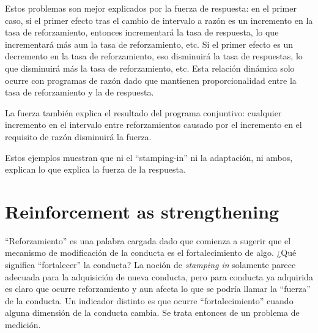 \documentclass[a4paper,12pt]{article}
\begin{document}
Estos problemas son mejor explicados por la fuerza de respuesta: en el primer caso, si el primer efecto tras el cambio de intervalo a razón es un incremento en la tasa de reforzamiento, entonces incrementará la tasa de respuesta, lo que incrementará más aun la tasa de reforzamiento, etc. Si el primer efecto es un decremento en la tasa de reforzamiento, eso disminuirá la tasa de respuestas, lo que disminuirá más la tasa de reforzamiento, etc.
Esta relación dinámica solo ocurre con programas de razón dado que mantienen proporcionalidad entre la tasa de reforzamiento y la de respuesta.

La fuerza también explica el resultado del programa conjuntivo: cualquier incremento en el intervalo entre reforzamientos causado por el incremento en el requisito de razón disminuirá la fuerza.

Estos ejemplos muestran que ni el ``stamping-in'' ni la adaptación, ni ambos, explican lo que explica la fuerza de la respuesta.

\section{Reinforcement as strengthening}

``Reforzamiento'' es una palabra cargada dado que comienza a sugerir que el mecanismo de modificación de la conducta es el fortalecimiento de algo.
¿Qué significa ``fortalecer'' la conducta?
La noción de {\itshape stamping in} solamente parece adecuada para la adquisición de nueva conducta, pero para conducta ya adquirida es claro que ocurre reforzamiento y aun afecta lo que se podría llamar la ``fuerza'' de la conducta.
Un indicador distinto es que ocurre ``fortalecimiento'' cuando alguna dimensión de la conducta cambia.
Se trata entonces de un problema de medición.
\end{document}
